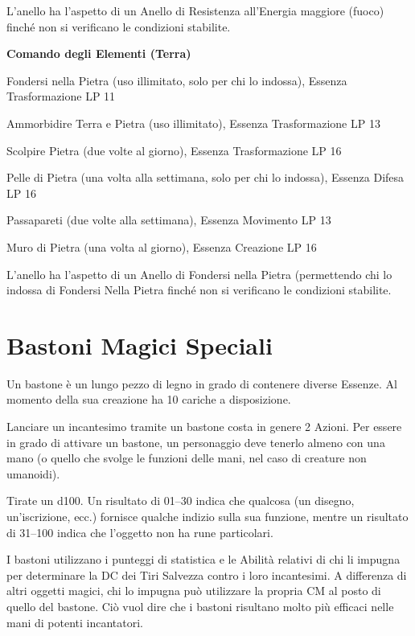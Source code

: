 \documentclass[a4paper,11pt,twoside,openany]{book}
\begin{document}
L'anello ha l'aspetto di un Anello di Resistenza all'Energia maggiore (fuoco) finché non si verificano le condizioni stabilite.

\textbf{Comando degli Elementi (Terra)}

Fondersi nella Pietra (uso illimitato, solo per chi lo indossa), Essenza Trasformazione LP 11

Ammorbidire Terra e Pietra (uso illimitato), Essenza Trasformazione LP 13

Scolpire Pietra (due volte al giorno), Essenza Trasformazione LP 16

Pelle di Pietra (una volta alla settimana, solo per chi lo indossa), Essenza Difesa LP 16

Passapareti (due volte alla settimana), Essenza Movimento LP 13

Muro di Pietra (una volta al giorno), Essenza Creazione LP 16

L'anello ha l'aspetto di un Anello di Fondersi nella Pietra (permettendo chi lo indossa di Fondersi Nella Pietra finché non si verificano le condizioni stabilite.

\pagebreak

\section{Bastoni Magici Speciali}

\label{bastoni-magici-speciali}

Un bastone è un lungo pezzo di legno in grado di contenere diverse Essenze. Al momento della sua creazione ha 10 cariche a disposizione.

Lanciare un incantesimo tramite un bastone costa in genere 2 Azioni. Per essere in grado di attivare un bastone, un personaggio deve tenerlo almeno con una mano (o quello che svolge le funzioni delle mani, nel caso di creature non umanoidi).

Tirate un d100. Un risultato di 01--30 indica che qualcosa (un disegno, un'iscrizione, ecc.) fornisce qualche indizio sulla sua funzione, mentre un risultato di 31--100 indica che l'oggetto non ha rune particolari.

I bastoni utilizzano i punteggi di statistica e le Abilità relativi di chi li impugna per determinare la DC dei Tiri Salvezza contro i loro incantesimi. A differenza di altri oggetti magici, chi lo impugna può utilizzare la propria CM al posto di quello del bastone. Ciò vuol dire che i bastoni risultano molto più efficaci nelle mani di potenti incantatori.
\end{document}
